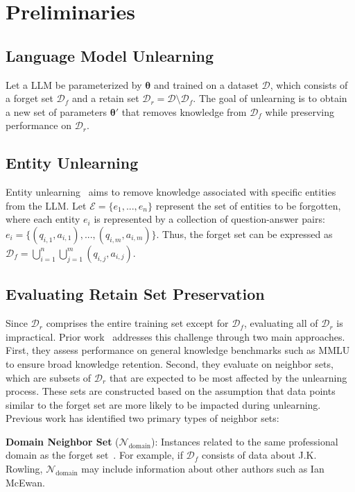 \section{Preliminaries}
\subsection{Language Model Unlearning}
Let a LLM be parameterized by $\bm{\theta}$ and trained on a dataset $\mathcal{D}$, which consists of a forget set $\mathcal{D}_f$ and a retain set $\mathcal{D}_r = \mathcal{D} \setminus \mathcal{D}_f$. The goal of unlearning is to obtain a new set of parameters $\bm{\theta'}$ that removes knowledge from $\mathcal{D}_f$ while preserving performance on $\mathcal{D}_r$.
\subsection{Entity Unlearning}
Entity unlearning~\citep{maini2024tofu, rwku} aims to remove knowledge associated with specific entities from the LLM. Let $\mathcal{E} = \{e_1, ..., e_n\}$ represent the set of entities to be forgotten, where each entity $e_i$ is represented by a collection of question-answer pairs: $e_i = \{(q_{i,1}, a_{i,1}), ..., (q_{i,m}, a_{i,m})\}$. Thus, the forget set can be expressed as $\mathcal{D}_f = \bigcup_{i=1}^{n} \bigcup_{j=1}^{m} (q_{i,j}, a_{i,j})$.

\subsection{Evaluating Retain Set Preservation}
\label{subsec:EvaluatingRetainSetPreservation}
Since $\mathcal{D}_r$ comprises the entire training set except for $\mathcal{D}_f$, evaluating all of $\mathcal{D}_r$ is impractical. Prior work~\cite{maini2024tofu, rwku} addresses this challenge through two main approaches. First, they assess performance on general knowledge benchmarks such as MMLU~\citep{hendrycks2021measuring} to ensure broad knowledge retention. Second, they evaluate on neighbor sets, which are subsets of $\mathcal{D}_r$ that are expected to be most affected by the unlearning process. These sets are constructed based on the assumption that data points similar to the forget set are more likely to be impacted during unlearning.
Previous work has identified two primary types of neighbor sets:

\noindent
\textbf{Domain Neighbor Set} ($\mathcal{N}_{\text{domain}}$): Instances related to the same professional domain as the forget set~\citep{closerlookat, maini2024tofu}. For example, if $\mathcal{D}_f$ consists of data about J.K. Rowling, $\mathcal{N}_{\text{domain}}$ may include information about other authors such as Ian McEwan.

